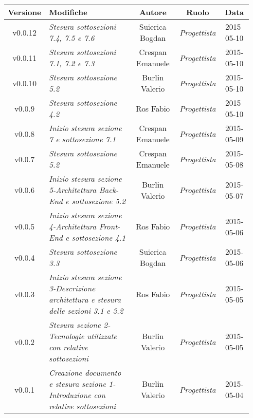 \newpage

\begin{table}[h]
\centering
\begin{tabular}{|c|p{}|c|c|c|}
	\toprule
	\textbf{Versione} & \textbf{Modifiche} & \textbf{Autore} & \textbf{Ruolo} & \textbf{Data} \\
	\midrule
	\midrule
		v0.0.12 & \textit{Stesura sottosezioni 7.4, 7.5 e 7.6} & Suierica Bogdan & \textit{Progettista} & 2015-05-10\\
	\midrule
		v0.0.11 & \textit{Stesura sottosezioni 7.1, 7.2 e 7.3} & Crespan Emanuele & \textit{Progettista} & 2015-05-10\\
	\midrule
		v0.0.10 & \textit{Stesura sottosezione 5.2} & Burlin Valerio & \textit{Progettista} & 2015-05-10\\
	\midrule
		v0.0.9 & \textit{Stesura sottosezione 4.2} & Ros Fabio & \textit{Progettista} & 2015-05-10\\
	\midrule
		v0.0.8 & \textit{Inizio stesura sezione 7 e sottosezione 7.1} & Crespan Emanuele & \textit{Progettista} & 2015-05-09\\
	\midrule
		v0.0.7 & \textit{Stesura sottosezione 5.2} & Crespan Emanuele & \textit{Progettista} & 2015-05-08\\
	\midrule
		v0.0.6 & \textit{Inizio stesura sezione 5-Architettura Back-End e sottosezione 5.2} & Burlin Valerio & \textit{Progettista} & 2015-05-07\\
	\midrule
		v0.0.5 & \textit{Inizio stesura sezione 4-Architettura Front-End e sottosezione 4.1} & Ros Fabio & \textit{Progettista} & 2015-05-06\\
	\midrule
		v0.0.4 & \textit{Stesura sottosezione 3.3} & Suierica Bogdan & \textit{Progettista} & 2015-05-06\\
	\midrule
		v0.0.3 & \textit{Inizio stesura sezione 3-Descrizione architettura e stesura delle sezioni 3.1 e 3.2} & Ros Fabio & \textit{Progettista} & 2015-05-05\\
	\midrule
		v0.0.2 & \textit{Stesura sezione 2-Tecnologie utilizzate con relative sottosezioni} & Burlin Valerio & \textit{Progettista} & 2015-05-05\\
	\midrule
		v0.0.1 & \textit{Creazione documento e stesura sezione 1-Introduzione con relative sottosezioni} & Burlin Valerio & \textit{Progettista} & 2015-05-04\\
	\bottomrule
\end{tabular}
\end{table}
\newpage
